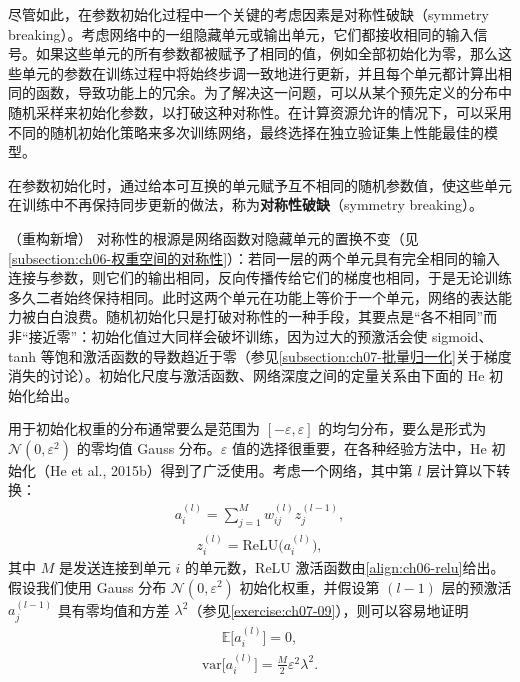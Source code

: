 \documentclass[../../main.tex]{subfiles}
\begin{document}
尽管如此，在参数初始化过程中一个关键的考虑因素是对称性破缺（symmetry breaking）。考虑网络中的一组隐藏单元或输出单元，它们都接收相同的输入信号。如果这些单元的所有参数都被赋予了相同的值，例如全部初始化为零，那么这些单元的参数在训练过程中将始终步调一致地进行更新，并且每个单元都计算出相同的函数，导致功能上的冗余。为了解决这一问题，可以从某个预先定义的分布中随机采样来初始化参数，以打破这种对称性。在计算资源允许的情况下，可以采用不同的随机初始化策略来多次训练网络，最终选择在独立验证集上性能最佳的模型。

\begin{definition}[对称性破缺]\label{definition:ch07-对称性破缺}
在参数初始化时，通过给本可互换的单元赋予互不相同的随机参数值，使这些单元在训练中不再保持同步更新的做法，称为\textbf{对称性破缺}（symmetry breaking）。
\end{definition}

\begin{remark}（重构新增）
对称性的根源是网络函数对隐藏单元的置换不变（见\cref{subsection:ch06-权重空间的对称性}）：若同一层的两个单元具有完全相同的输入连接与参数，则它们的输出相同，反向传播传给它们的梯度也相同，于是无论训练多久二者始终保持相同。此时这两个单元在功能上等价于一个单元，网络的表达能力被白白浪费。随机初始化只是打破对称性的一种手段，其要点是“各不相同”而非“接近零”：初始化值过大同样会破坏训练，因为过大的预激活会使 sigmoid、tanh 等饱和激活函数的导数趋近于零（参见\cref{subsection:ch07-批量归一化}关于梯度消失的讨论）。初始化尺度与激活函数、网络深度之间的定量关系由下面的 He 初始化给出。
\end{remark}

用于初始化权重的分布通常要么是范围为 $[-\varepsilon,\varepsilon]$ 的均匀分布，要么是形式为 $\mathcal{N}(0,\varepsilon^{2})$ 的零均值 Gauss 分布。$\varepsilon$ 值的选择很重要，在各种经验方法中，He 初始化（He et al., 2015b）得到了广泛使用。考虑一个网络，其中第 $l$ 层计算以下转换：
\begin{align}
a_i^{(l)} = \sum_{j=1}^{M}w_{ij}^{(l)}z_j^{(l-1)},
\label{align:ch07-前向计算}
\end{align}
\begin{align}
z_i^{(l)} = \mathrm{ReLU}\bigl(a_i^{(l)}\bigr),
\label{align:ch07-激活函数}
\end{align}
其中 $M$ 是发送连接到单元 $i$ 的单元数，ReLU 激活函数由\eqref{align:ch06-relu}给出。假设我们使用 Gauss 分布 $\mathcal{N}(0,\varepsilon^{2})$ 初始化权重，并假设第 $(l-1)$ 层的预激活 $a_j^{(l-1)}$ 具有零均值和方差 $\lambda^{2}$（参见\cref{exercise:ch07-09}），则可以容易地证明
\begin{align}
\mathbb{E}\bigl[a_i^{(l)}\bigr] = 0,
\label{align:ch07-初始化均值}
\end{align}
\begin{align}
\mathrm{var}\bigl[a_i^{(l)}\bigr] = \frac{M}{2}\varepsilon^{2}\lambda^{2}.
\label{align:ch07-初始化方差}
\end{align}
\end{document}
